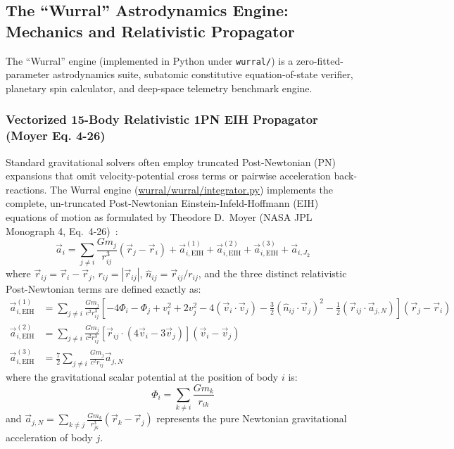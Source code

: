 \documentclass[11pt,a4paper]{article}
\begin{document}
\subsection{The ``Wurral'' Astrodynamics Engine: Mechanics and Relativistic Propagator}
\label{subsec:wurral_engine}

The ``Wurral'' engine (implemented in Python under \texttt{wurral/}) is a zero-fitted-parameter astrodynamics suite, subatomic constitutive equation-of-state verifier, planetary spin calculator, and deep-space telemetry benchmark engine.

\subsubsection{Vectorized 15-Body Relativistic 1PN EIH Propagator (Moyer Eq. 4-26)}
\label{subsubsec:eih_propagator}

Standard gravitational solvers often employ truncated Post-Newtonian (PN) expansions that omit velocity-potential cross terms or pairwise acceleration back-reactions. The Wurral engine (\url{wurral/wurral/integrator.py}) implements the complete, un-truncated Post-Newtonian Einstein-Infeld-Hoffmann (EIH) equations of motion as formulated by Theodore D.~Moyer (NASA JPL Monograph 4, Eq.~4-26)~\cite{Moyer2003}:
\begin{equation}
\vec{a}_i = \sum_{j \neq i} \frac{G m_j}{r_{ij}^3} (\vec{r}_j - \vec{r}_i) + \vec{a}_{i,\text{EIH}}^{(1)} + \vec{a}_{i,\text{EIH}}^{(2)} + \vec{a}_{i,\text{EIH}}^{(3)} + \vec{a}_{i,J_2}
\label{eq:eih_total}
\end{equation}
where $\vec{r}_{ij} = \vec{r}_i - \vec{r}_j$, $r_{ij} = |\vec{r}_{ij}|$, $\hat{n}_{ij} = \vec{r}_{ij} / r_{ij}$, and the three distinct relativistic Post-Newtonian terms are defined exactly as:
\begin{align}
\vec{a}_{i,\text{EIH}}^{(1)} &= \sum_{j \neq i} \frac{G m_j}{c^2 r_{ij}^3} \left[ -4 \Phi_i - \Phi_j + v_i^2 + 2 v_j^2 - 4(\vec{v}_i \cdot \vec{v}_j) - \frac{3}{2}(\hat{n}_{ij} \cdot \vec{v}_j)^2 - \frac{1}{2}(\vec{r}_{ij} \cdot \vec{a}_{j,N}) \right] (\vec{r}_j - \vec{r}_i) \label{eq:eih_term1} \\
\vec{a}_{i,\text{EIH}}^{(2)} &= \sum_{j \neq i} \frac{G m_j}{c^2 r_{ij}^3} \left[ \vec{r}_{ij} \cdot (4 \vec{v}_i - 3 \vec{v}_j) \right] (\vec{v}_i - \vec{v}_j) \label{eq:eih_term2} \\
\vec{a}_{i,\text{EIH}}^{(3)} &= \frac{7}{2} \sum_{j \neq i} \frac{G m_j}{c^2 r_{ij}} \vec{a}_{j,N} \label{eq:eih_term3}
\end{align}
where the gravitational scalar potential at the position of body $i$ is:
\begin{equation}
\Phi_i = \sum_{k \neq i} \frac{G m_k}{r_{ik}}
\label{eq:grav_potential}
\end{equation}
and $\vec{a}_{j,N} = \sum_{k \neq j} \frac{G m_k}{r_{jk}^3}(\vec{r}_k - \vec{r}_j)$ represents the pure Newtonian gravitational acceleration of body $j$.
\end{document}
